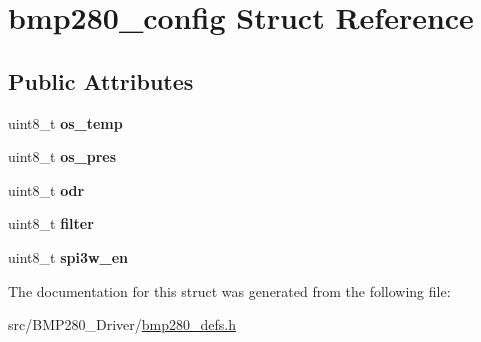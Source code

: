\hypertarget{structbmp280__config}{}\section{bmp280\+\_\+config Struct Reference}
\label{structbmp280__config}
\subsection*{Public Attributes}
\begin{DoxyCompactItemize}
\item 
\mbox{\label{structbmp280__config_a2dce90a004a5feb1c71770a24acdc33e}} 
uint8\+\_\+t {\bfseries os\+\_\+temp}
\item 
\mbox{\label{structbmp280__config_a62d43cde776283413c3ed1b6b0b40d54}} 
uint8\+\_\+t {\bfseries os\+\_\+pres}
\item 
\mbox{\label{structbmp280__config_a7ffcc46b21ffc9ee6860cc77f405436c}} 
uint8\+\_\+t {\bfseries odr}
\item 
\mbox{\label{structbmp280__config_a18b9b6cdf0431e55e40d11a402313e07}} 
uint8\+\_\+t {\bfseries filter}
\item 
\mbox{\label{structbmp280__config_ac9a0540470596a6efcc06ff87bd435d5}} 
uint8\+\_\+t {\bfseries spi3w\+\_\+en}
\end{DoxyCompactItemize}


The documentation for this struct was generated from the following file\+:\begin{DoxyCompactItemize}
\item 
src/\+B\+M\+P280\+\_\+\+Driver/\mbox{\hyperlink{bmp280__defs_8h}{bmp280\+\_\+defs.\+h}}\end{DoxyCompactItemize}
